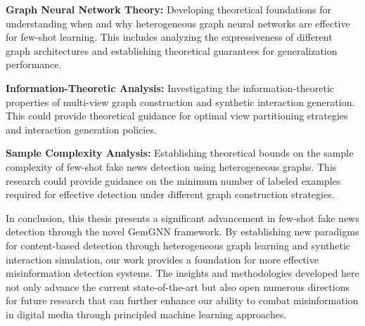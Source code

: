 \textbf{Graph Neural Network Theory:} Developing theoretical foundations for understanding when and why heterogeneous graph neural networks are effective for few-shot learning. This includes analyzing the expressiveness of different graph architectures and establishing theoretical guarantees for generalization performance.

\textbf{Information-Theoretic Analysis:} Investigating the information-theoretic properties of multi-view graph construction and synthetic interaction generation. This could provide theoretical guidance for optimal view partitioning strategies and interaction generation policies.

\textbf{Sample Complexity Analysis:} Establishing theoretical bounds on the sample complexity of few-shot fake news detection using heterogeneous graphs. This research could provide guidance on the minimum number of labeled examples required for effective detection under different graph construction strategies.

In conclusion, this thesis presents a significant advancement in few-shot fake news detection through the novel GemGNN framework. By establishing new paradigms for content-based detection through heterogeneous graph learning and synthetic interaction simulation, our work provides a foundation for more effective misinformation detection systems. The insights and methodologies developed here not only advance the current state-of-the-art but also open numerous directions for future research that can further enhance our ability to combat misinformation in digital media through principled machine learning approaches.

\EndChapter
